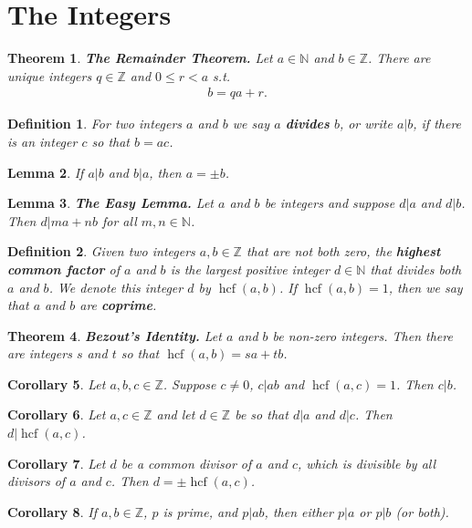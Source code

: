 \documentclass{article}
\theoremstyle{sltheorem}
\newtheorem{definition}{Definition}[section]
\newtheorem{theorem}{Theorem}[section]
\newtheorem{lemma}[theorem]{Lemma}
\newtheorem{corollary}[theorem]{Corollary}
\newcommand{\N}{\mathbb{N}}
\newcommand{\Z}{\mathbb{Z}}
\DeclareMathOperator{\hcf}{hcf}
\begin{document}
\section{The Integers}
\begin{theorem}
    \textbf{The Remainder Theorem.} Let $a\in\N$ and $b\in\mathbb{Z}$.
    There are unique integers $q\in\mathbb{Z}$ and $0\leq r<a$ s.t.
    \begin{align*}
        b=qa+r.
    \end{align*}
\end{theorem}
\begin{definition}
    For two integers $a$ and $b$ we say $a$ \textbf{divides} $b$, or write $a|b$, if there is an integer $c$ so that $b=ac$.
\end{definition}
\begin{lemma}
    If $a|b$ and $b|a$, then $a=\pm b$.
\end{lemma}
\begin{lemma}
    \textbf{The Easy Lemma.} Let $a$ and $b$ be integers and suppose $d|a$ and $d|b$. Then $d|ma+nb$ for all $m,n\in\N$.
\end{lemma}
\begin{definition}
    Given two integers $a,b\in\mathbb{Z}$ that are not both zero, the \textbf{highest common factor} of $a$ and $b$ is the largest positive integer $d\in\N$ that divides both $a$ and $b$.
    We denote this integer $d$ by $\hcf(a,b)$. If $\hcf(a,b)=1$, then we say that $a$ and $b$ are \textbf{coprime}.
\end{definition}
\begin{theorem}
    \textbf{Bezout's Identity.} Let $a$ and $b$ be non-zero integers. Then there are integers $s$ and $t$ so that $\hcf(a,b)=sa+tb$.
\end{theorem}
\begin{corollary}
    Let $a,b,c\in\Z$. Suppose $c\not=0$, $c|ab$ and $\hcf(a,c)=1$. Then $c|b$.
\end{corollary}
\begin{corollary}
    Let $a,c\in\Z$ and let $d\in\Z$ be so that $d|a$ and $d|c$. Then $d|\hcf(a,c)$.
\end{corollary}
\begin{corollary}
    Let $d$ be a common divisor of $a$ and $c$, which is divisible by all divisors of $a$ and $c$. Then $d=\pm\hcf(a,c)$.
\end{corollary}
\begin{corollary}
    If $a,b\in\Z$, $p$ is prime, and $p|ab$, then either $p|a$ or $p|b$ (or both).
\end{corollary}
\end{document}
